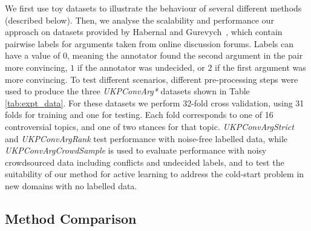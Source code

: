 We first use toy datasets to illustrate the behaviour of several different methods (described below).
Then, 
we analyse the scalability and performance our approach on datasets provided by Habernal and Gurevych~,
which contain pairwise labels for arguments taken from online discussion forums.
Labels can have a value of $0$, meaning the annotator found the second argument in the pair more convincing,
$1$ if the annotator was undecided, or $2$ if the first argument was more convincing.
To test different scenarios, different pre-processing steps were used to produce the
three \emph{UKPConvArg*} datasets shown in Table \ref{tab:expt_data}.
For these datasets we perform 32-fold cross validation, using 31 folds for training and one for testing. 
Each fold corresponds to one of 16 controversial topics, and one of two stances for that topic.
\emph{UKPConvArgStrict} and \emph{UKPConvArgRank} test performance with noise-free labelled data,
while \emph{UKPConvArgCrowdSample} is used to evaluate performance with noisy crowdsourced data 
including conflicts and undecided labels, and to test the suitability of our method for active learning
to address the cold-start problem in new domains with no labelled data.
 
\subsection{Method Comparison}

